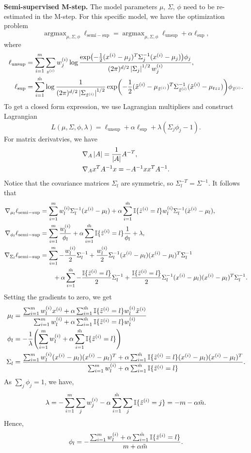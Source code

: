 \documentclass[12pt,letterpaper,boxed]{hmcpset}
\newcommand{\ww}{w^{(i)}}
\newcommand{\ind}[1]{\mathbb{I}\{#1\}}
\DeclareMathOperator*{\argmax}{argmax}
\newcommand{\lunsup}{\ell_{\mathrm{unsup}}}
\newcommand{\lsup}{\ell_{\mathrm{sup}}}
\newcommand{\lsemi}{\ell_{\mathrm{semi-sup}}}
\newcommand{\summ}{\sum_{i=1}^m}
\newcommand{\sumtm}{\sum_{i=1}^{\tilde m}}
\begin{document}
\begin{solution}
  \item \textbf{Semi-supervised M-step.} The model parameters $\mu$, $\Sigma$, $\phi$ need to be re-estimated in the M-step. For this specific model, we have the optimization problem
  \[
  \argmax_{\mu, \Sigma, \phi} \lsemi = \argmax_{\mu, \Sigma, \phi} \lunsup + \alpha \lsup, 
  \]
  where
  \[
  \begin{aligned}
    \lunsup &= \sum_{i=1}^m \sum_{\zz} \ww_j \log \frac{\exp(-\frac{1}{2} (\xx - \mu_j)^T \Sigma_j^{-1} (\xx - \mu_j)) \phi_j}{(2\pi)^{d/2} \abs{\Sigma_j}^{1/2} \ww_j}, \\
    \lsup &= \sum_{i=1}^{\tilde{m}} \log \frac{1}{(2\pi)^{d/2} \abs{\Sigma_{\tzz}}^{1/2}} \exp(-\frac{1}{2} (\txx - \mu_{\tzz})^T \Sigma_{\tzz}^{-1} (\txx - \mu_{tzz})) \phi_{\tzz}.
  \end{aligned}
  \]
  To get a closed form expression, we use Lagrangian multipliers and construct Lagrangian
  \[
  L(\mu, \Sigma, \phi, \lambda) = \lunsup + \alpha \lsup + \lambda (\Sigma_j \phi_j - 1).
  \]
  For matrix derivatvies, we have
  \[
  \begin{aligned}
    &\nabla_A \left\lvert A\right\rvert = \frac{1}{\left\lvert A\right\rvert} A^{-T}, \\
    &\nabla_A x^T A^{-1} x = - A^{-1} x x^T A^{-1}.
  \end{aligned}
  \]
  Notice that the covariance matrices $\Sigma_l$ are symmetric, so $\Sigma_l^{-T} = \Sigma^{-1}$. It follows that
  \[
  \begin{aligned}
    \nabla_{\mu_l} \lsemi &= \sum_{i=1}^{m} \ww_l \Sigma_l^{-1} (\xx - \mu_l) + \alpha \sum_{i=1}^{\tilde{m}} \ind{\tzz = l} \ww_l \Sigma_l^{-1} (\txx - \mu_l), \\
    \nabla_{\phi_l} \lsemi &=  \sum_{i=1}^m \frac{\ww_l}{\phi_l} + \alpha \sum_{i=1}^{\tilde{m}} \ind{\tzz = l} \frac{1}{\phi_l} + \lambda, \\
    \nabla_{\Sigma_l} \lsemi &= \sum_{i=1}^m -\frac{\ww_l}{2}\Sigma_l^{-1} + \frac{\ww_l}{2} \Sigma_l^{-1} (\xx - \mu_l)(\xx - \mu_l)^T \Sigma_l^{-1} \\
    & \qquad + \alpha \sum_{i=1}^{\tilde{m}} - \frac{\ind{\tzz = l} }{2}\Sigma_l^{-1} + \frac{\ind{\tzz = l } }{2} \Sigma_l^{-1} (\xx - \mu_l)(\xx - \mu_l)^T \Sigma_l^{-1}.
  \end{aligned}
  \]
  Setting the gradients to zero, we get
  \[
  \begin{aligned}
    \mu_l &= \frac{\sum_{i=1}^m \ww_l \xx + \alpha \sum_{i=1}^{\tilde{m}} \ind{\tzz = l} \ww_l \txx}{\sum_{i=1}^m \ww_l + \alpha \sum_{i=1}^{\tilde{m}} \ind{\tzz = l} \ww_l} \\
    \phi_l &= - \frac{1}{\lambda} \qty(\summ \ww_l + \alpha \sumtm \ind{\tzz = l}) \\
    \Sigma_l &= \frac{\summ \ww_l (\xx - \mu_l)(\xx - \mu_l)^T + \alpha \sumtm \ind{\tzz = l} (\xx - \mu_l)(\xx - \mu_l)^T}{\summ \ww_l + \alpha \sumtm \ind{\tzz = l}}.
  \end{aligned}
  \]
  As $\sum_j \phi_j = 1$, we have,
  \[
  \lambda = - \summ \sum_j \ww_j - \alpha \sumtm \sum_j\ind{\tzz = j} = - m - \alpha \tilde{m}.
  \]
  Hence,
  \[
  \phi_l = - \frac{\summ \ww_l + \alpha \sumtm \ind{\tzz = l}}{m + \alpha \tilde{m}}.
  \]
\end{solution}
\end{document}
